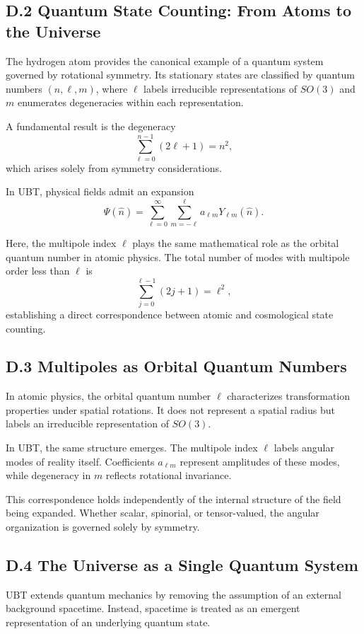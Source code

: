 \subsection*{D.2 Quantum State Counting: From Atoms to the Universe}

The hydrogen atom provides the canonical example of a quantum system governed by rotational symmetry. Its stationary states are classified by quantum numbers $(n,\ell,m)$, where $\ell$ labels irreducible representations of $SO(3)$ and $m$ enumerates degeneracies within each representation.

A fundamental result is the degeneracy
\[
\sum_{\ell=0}^{n-1}(2\ell+1)=n^2,
\]
which arises solely from symmetry considerations.

In UBT, physical fields admit an expansion
\[
\Psi(\hat n)=\sum_{\ell=0}^{\infty}\sum_{m=-\ell}^{\ell} a_{\ell m}Y_{\ell m}(\hat n).
\]

Here, the multipole index $\ell$ plays the same mathematical role as the orbital quantum number in atomic physics. The total number of modes with multipole order less than $\ell$ is
\[
\sum_{j=0}^{\ell-1}(2j+1)=\ell^2,
\]
establishing a direct correspondence between atomic and cosmological state counting.

\subsection*{D.3 Multipoles as Orbital Quantum Numbers}

In atomic physics, the orbital quantum number $\ell$ characterizes transformation properties under spatial rotations. It does not represent a spatial radius but labels an irreducible representation of $SO(3)$.

In UBT, the same structure emerges. The multipole index $\ell$ labels angular modes of reality itself. Coefficients $a_{\ell m}$ represent amplitudes of these modes, while degeneracy in $m$ reflects rotational invariance.

This correspondence holds independently of the internal structure of the field being expanded. Whether scalar, spinorial, or tensor-valued, the angular organization is governed solely by symmetry.

\subsection*{D.4 The Universe as a Single Quantum System}

UBT extends quantum mechanics by removing the assumption of an external background spacetime. Instead, spacetime is treated as an emergent representation of an underlying quantum state.

